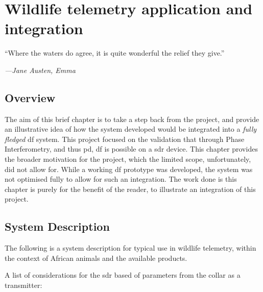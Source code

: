 \documentclass[class=report,11pt,crop=false]{standalone}
\begin{document}
\chapter{Wildlife telemetry application and integration \label{ch:application}}
\epigraph{``Where the waters do agree, it is quite wonderful the relief they give.''}%
    {\emph{---Jane Austen, Emma}}
\vspace{0.5cm}

\section{Overview}
The aim of this brief chapter is to take a step back from the project, and provide an illustrative idea of how the system developed would be integrated into a \emph{fully fledged} \gls{df} system. This project focused on the validation that through Phase Interferometry, and thus \gls{pd}, \gls{df} is possible on a \gls{sdr} device. This chapter provides the broader motivation for the project, which the limited scope, unfortunately, did not allow for. While a working \gls{df} prototype was developed, the system was not optimised fully to allow for such an integration. The work done is this chapter is purely for the benefit of the reader, to illustrate an integration of this project.


\section{System Description}
The following is a system description for typical use in wildlife telemetry, within the context of African animals and the available products.


A list of considerations for the \gls{sdr} based of parameters from the collar as a transmitter:
\end{document}
